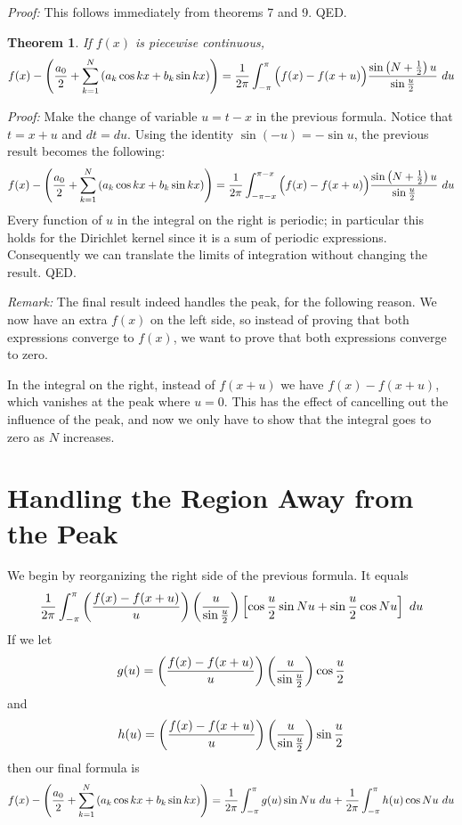 \documentclass[11pt, oneside]{article}   	%
\newtheorem{theorem}{Theorem}
\begin{document}
{\em Proof:} This follows immediately from theorems 7 and 9. QED.

\begin{theorem} If $f(x)$ is piecewise continuous,
\[f(x) - \left({{a_0} \over 2} + \sum_{k = 1}^N \left( a_k \cos kx + b_k \sin kx \right)\right) =  {1 \over {2 \pi}} \int_{- \pi}^\pi  \Big( f(x) - f(x + u)\Big) {{\sin \left(N + {1 \over 2}\right)u} \over {\sin {{u \over 2}}}} \ du\]
\end{theorem}

{\em Proof:} Make the change of variable $u = t - x$ in the previous formula. Notice that $t = x + u$ and $dt = du$. Using the identity $\sin(-u) = - \sin u$, the previous result becomes the following:
\[f(x) - \left({{a_0} \over 2} + \sum_{k = 1}^N \left( a_k \cos kx + b_k \sin kx \right)\right) =  {1 \over {2 \pi}} \int_{- \pi - x}^{\pi- x} \Big( f(x) - f(x + u)\Big) {{\sin \left(N + {1 \over 2}\right)u} \over {\sin {{u \over 2}}}} \ du\]
Every function of $u$ in the integral on the right is periodic; in particular this holds for the Dirichlet kernel since it is a sum of periodic expressions. Consequently we can translate the limits of integration without changing the result. QED.

{\em Remark:} The final result indeed handles the peak, for the following reason. We now have an extra $f(x)$ on the left side, so instead of proving that both expressions converge to $f(x)$, we want to prove that both expressions converge to zero. 

In the integral on the right, instead of $f(x + u)$ we have $f(x) - f(x + u)$,
which vanishes at the peak where $u = 0$. This has the effect of cancelling out the influence of the peak,
and now we only have to show that the integral goes to zero as $N$ increases.


\section{Handling the Region Away from the Peak}
 
We begin by reorganizing the right side of the previous formula. It equals
\[ {1 \over {2 \pi}} \int_{- \pi}^\pi \left( {{f(x) - f(x + u)} \over {u}}\right)  \left( {{u} \over {\sin {{u} \over 2}}} \right)
\left[\cos {u \over 2} \sin Nu + \sin {u \over 2} \cos Nu \right] \ du\]
If we let
\[g(u) = \left( {{f(x) - f(x + u)} \over {u}}\right)  \left( {{u} \over {\sin {{u} \over 2}}} \right) \cos {u \over 2}\]
and
\[h(u) = \left( {{f(x) - f(x + u)} \over {u}}\right)  \left( {{u} \over {\sin {{u} \over 2}}} \right) \sin {u \over 2}\]
then our final formula is
\[f(x) - \left({{a_0} \over 2} + \sum_{k = 1}^N \left( a_k \cos kx + b_k \sin kx \right)\right) = {1 \over {2 \pi}} \int_{- \pi}^\pi g(u) \sin Nu \ du +  {1 \over {2 \pi}} \int_{- \pi}^\pi h(u) \cos Nu \ du\]
\end{document}
